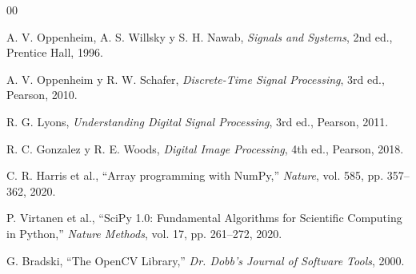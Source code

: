 
\begin{thebibliography}{00}

A. V. Oppenheim, A. S. Willsky y S. H. Nawab,
\textit{Signals and Systems},
2nd ed., Prentice Hall, 1996.

A. V. Oppenheim y R. W. Schafer,
\textit{Discrete-Time Signal Processing},
3rd ed., Pearson, 2010.

R. G. Lyons,
\textit{Understanding Digital Signal Processing},
3rd ed., Pearson, 2011.

R. C. Gonzalez y R. E. Woods,
\textit{Digital Image Processing},
4th ed., Pearson, 2018.

C. R. Harris et al.,
``Array programming with NumPy,''
\textit{Nature}, vol. 585, pp. 357--362, 2020.

P. Virtanen et al.,
``SciPy 1.0: Fundamental Algorithms for Scientific Computing in Python,''
\textit{Nature Methods}, vol. 17, pp. 261--272, 2020.

G. Bradski,
``The OpenCV Library,''
\textit{Dr. Dobb's Journal of Software Tools}, 2000.

\end{thebibliography}
